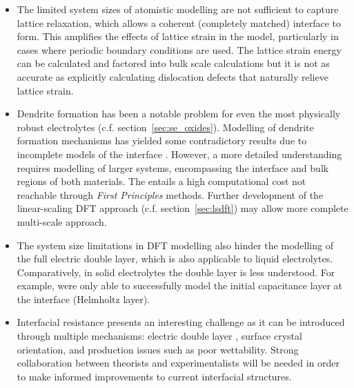 \documentclass[../main.tex]{subfiles}
\begin{document}
\begin{itemize}
    \item The limited system sizes of atomistic modelling are not sufficient to capture lattice relaxation, which allows a coherent (completely matched) interface to form. This amplifies the effects of lattice strain in the model, particularly in cases where periodic boundary conditions are used. \cite{Lepley2015} The lattice strain energy can be calculated and factored into bulk scale calculations but it is not as accurate as explicitly calculating dislocation defects that naturally relieve lattice strain.\cite{Rodney2017, Clouet2020}
    \item Dendrite formation has been a notable problem for even the most physically robust electrolytes (c.f. section~\ref{sec:se_oxides}). Modelling of dendrite formation mechanisms has yielded some contradictory results due to incomplete models of the interface \cite{Tian2018, Gao2020, Canepa2018}. However, a more detailed understanding requires modelling of larger systems, encompassing the interface and bulk regions of both materials. The entails a high computational cost not reachable through \textit{First Principles} methods. Further development of the linear-scaling DFT approach (c.f. section~\ref{sec:lsdft}) may allow more complete multi-scale approach.
    \item The system size limitations in DFT modelling also hinder the modelling of the full electric double layer, which is also applicable to liquid electrolytes. Comparatively, in solid electrolytes the double layer is less understood. For example, \citeauthor{Tateyama2019} were only able to successfully model the initial capacitance layer at the interface (Helmholtz layer).\cite{Tateyama2019}
    \item Interfacial resistance presents an interesting challenge as it can be introduced through multiple mechanisms\cite{Jiang2019}: electric double layer \cite{Tateyama2019}, surface crystal orientation\cite{Okuno2020}, and production issues such as poor wettability\cite{Sharafi2017}. Strong collaboration between theorists and experimentalists will be needed in order to make informed improvements to current interfacial structures.
\end{itemize}
\end{document}
